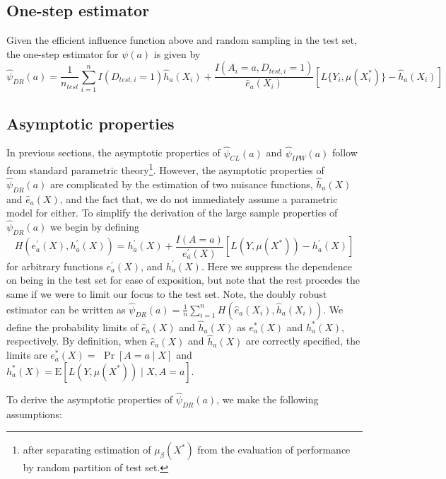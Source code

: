 \subsection{One-step estimator}
Given the efficient influence function above and  random sampling in the test set, the one-step estimator for $\psi(a)$ is given by
\begin{equation*}
    \widehat{\psi}_{DR}(a) = \frac{1}{n_{test}}\sum_{i=1}^n I(D_{test, i} = 1)\widehat{h}_a(X_i) + \frac{I(A_i = a, D_{test, i} = 1)}{\widehat{e}_a(X_i)} \left[ L\{Y_i, \mu(X^*_i)\} - \widehat{h}_a(X_i)\right]
\end{equation*}

\subsection{Asymptotic properties}
In previous sections, the asymptotic properties of $\widehat{\psi}_{CL}(a)$ and $\widehat{\psi}_{IPW}(a)$ follow from standard parametric theory\footnote{after separating estimation of $\mu_\beta(X^*)$ from the evaluation of performance by random partition of test set.}. However, the asymptotic properties of $\widehat{\psi}_{DR}(a)$ are complicated by the estimation of two nuisance functions, $\widehat{h}_a(X)$ and $\widehat{e}_a(X)$, and the fact that, we do not immediately assume a parametric model for either. To simplify the derivation of the large sample properties of $\widehat{\psi}_{DR}(a)$ we begin by defining
$$
H\left(e_a^{\prime}(X), h_a^{\prime}(X)\right)=h_a^{\prime}(X)+\frac{I(A = a)}{e_a^{\prime}(X)}\left[L\left(Y, \mu\left(X^*\right)\right)-h_a^{\prime}(X)\right]
$$
for arbitrary functions $e_a^{\prime}(X)$, and $h_a^{\prime}(X)$. Here we suppress the dependence on being in the test set for ease of exposition, but note that the rest procedes the same if we were to limit our focus to the test set. Note, the doubly robust estimator can be written as $\widehat{\psi}_{DR}(a)=\frac{1}{n} \sum_{i=1}^n H\left(\widehat{e}_a\left(X_i\right), \widehat{h}_a\left(X_i\right)\right)$. We define the probability limits of $\widehat{e}_a(X)$ and $\widehat{h}_a(X)$ as $e_a^*(X)$ and $h_a^*(X)$, respectively. By definition, when $\widehat{e}_a(X)$ and $\widehat{h}_a(X)$ are correctly specified, the limits are  $e_a^*(X)=$ $\operatorname{Pr}[A=a \mid X]$ and $h^*_a(X)=\mathrm{E}\left[L\left(Y, \mu\left(X^*\right)\right) \mid X, A=a\right]$.

To derive the asymptotic properties of $\widehat{\psi}_{DR}(a)$, we make the following assumptions:

